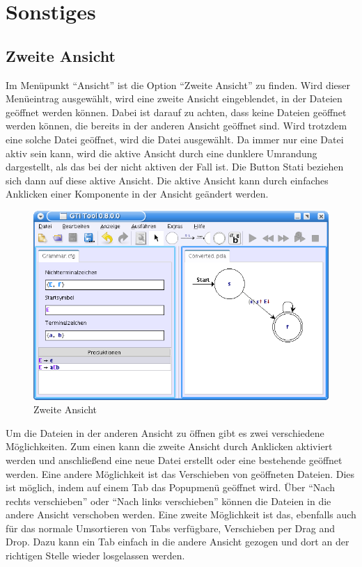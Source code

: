 \chapter{Sonstiges}


\section{Zweite Ansicht}

Im Menüpunkt "`Ansicht"' ist die Option "`Zweite Ansicht"' zu finden. Wird dieser
Menüeintrag ausgewählt, wird eine zweite Ansicht eingeblendet, in der Dateien
geöffnet werden können. Dabei ist darauf zu achten, dass keine Dateien geöffnet
werden können, die bereits in der anderen Ansicht geöffnet sind. Wird trotzdem
eine solche Datei geöffnet, wird die Datei ausgewählt. Da immer nur eine Datei
aktiv sein kann, wird die aktive Ansicht durch eine dunklere Umrandung
dargestellt, als das bei der nicht aktiven der Fall ist. Die Button Stati
beziehen sich dann auf diese aktive Ansicht. Die aktive Ansicht kann durch
einfaches Anklicken einer Komponente in der Ansicht geändert werden.\vspace{10pt}

\begin{figure}[h]
\begin{center}
\includegraphics[width=12cm]{../images/second_view.png}
\caption{Zweite Ansicht}
\end{center}
\end{figure}

Um die Dateien in der anderen Ansicht zu öffnen gibt es zwei verschiedene
Möglichkeiten. Zum einen kann die zweite Ansicht durch Anklicken aktiviert werden
und anschließend eine neue Datei erstellt oder eine bestehende geöffnet werden.
Eine andere Möglichkeit ist das Verschieben von geöffneten Dateien. Dies ist
möglich, indem auf einem Tab das Popupmenü geöffnet wird. Über "`Nach rechts
verschieben"' oder "`Nach links verschieben"' können die Dateien in die andere
Ansicht verschoben werden. Eine zweite Möglichkeit ist das, ebenfalls auch für
das normale Umsortieren von Tabs verfügbare, Verschieben per Drag and Drop.
Dazu kann ein Tab einfach in die andere Ansicht gezogen und dort an der richtigen
Stelle wieder losgelassen werden.\vspace{10pt}

